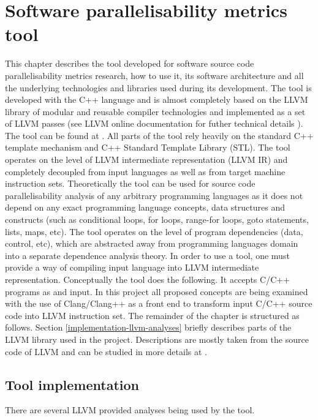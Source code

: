 \chapter{Software parallelisability metrics tool}
\qquad This chapter describes the tool developed for software source code parallelisability metrics research, how to use it, its software architecture and all the underlying technologies and libraries used during its development. \newline\null\qquad The tool is developed with the C++ language and is almost completely based on the \textsc{LLVM} library of modular and reusable compiler technologies \cite{llvm} \cite{llvm-official-website} and implemented as a set of LLVM passes (see LLVM online documentation for futher technical details \cite{llvm-online-docs}). The tool can be found at \cite{ppar-tool}. All parts of the tool rely heavily on the standard C++ template mechanism and C++ Standard Template Library (STL). \newline \null\qquad The tool operates on the level of LLVM intermediate representation \cite{llvm-online-docs-ir} (LLVM IR) and completely decoupled from input languages as well as from target machine instruction sets. Theoretically the tool can be used for source code parallelisability analysis of any arbitrary programming languages as it does not depend on any exact programming language concepts, data structures and constructs (such as conditional loops, for loops, range-for loops, goto statements, lists, maps, etc). The tool operates on the level of program dependencies (data, control, etc), which are abstracted away from programming languages domain into a separate dependence analysis theory. In order to use a tool, one must provide a way of compiling input language into LLVM intermediate representation. \newline \null\qquad Conceptually the tool does the following. It accepts C/C++ programs as and input. \newline \null\qquad In this project all proposed concepts are being examined with the use of Clang/Clang++ as a front end to transform input C/C++ source code into LLVM instruction set. \newline\null\qquad The remainder of the chapter is structured as follows. Section \ref{implementation-llvm-analyses} briefly describes parts of the LLVM library used in the project. Descriptions are mostly taken from the source code of LLVM and can be studied in more details at \cite{llvm-doxygen-docs}.     

\section{Tool implementation} \label{tool-implementation}
\qquad There are several LLVM provided analyses being used by the tool.

